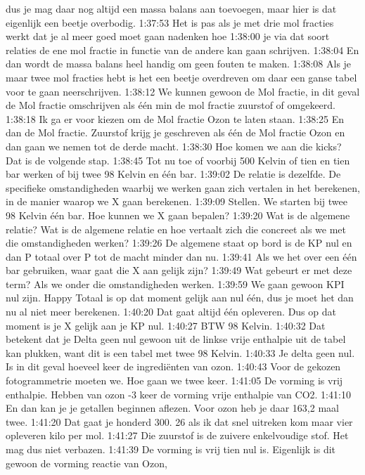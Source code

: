 dus je mag daar nog altijd een massa balans aan toevoegen, maar hier is dat eigenlijk een beetje overbodig.
1:37:53
Het is pas als je met drie mol fracties werkt dat je al meer goed moet gaan nadenken hoe
1:38:00
je via dat soort relaties de ene mol fractie in functie van de andere kan gaan schrijven.
1:38:04
En dan wordt de massa balans heel handig om geen fouten te maken.
1:38:08
Als je maar twee mol fracties hebt is het een beetje overdreven om daar een ganse tabel voor te gaan neerschrijven.
1:38:12
We kunnen gewoon de Mol fractie, in dit geval de Mol fractie omschrijven als één min de mol fractie zuurstof of omgekeerd.
1:38:18
Ik ga er voor kiezen om de Mol fractie Ozon te laten staan.
1:38:25
En dan de Mol fractie. Zuurstof krijg je geschreven als één de Mol fractie Ozon en dan gaan we nemen tot de derde macht.
1:38:30
Hoe komen we aan die kicks? Dat is de volgende stap.
1:38:45
Tot nu toe of voorbij 500 Kelvin of tien en tien bar werken of bij twee 98 Kelvin en één bar.
1:39:02
De relatie is dezelfde. De specifieke omstandigheden waarbij we werken gaan zich vertalen in het berekenen, in de manier waarop we X gaan berekenen.
1:39:09
Stellen. We starten bij twee 98 Kelvin één bar. Hoe kunnen we X gaan bepalen?
1:39:20
Wat is de algemene relatie? Wat is de algemene relatie en hoe vertaalt zich die concreet als we met die omstandigheden werken?
1:39:26
De algemene staat op bord is de KP nul en dan P totaal over P tot de macht minder dan nu.
1:39:41
Als we het over een één bar gebruiken, waar gaat die X aan gelijk zijn?
1:39:49
Wat gebeurt er met deze term? Als we onder die omstandigheden werken.
1:39:59
We gaan gewoon KPI nul zijn. Happy Totaal is op dat moment gelijk aan nul één, dus je moet het dan nu al niet meer berekenen.
1:40:20
Dat gaat altijd één opleveren. Dus op dat moment is je X gelijk aan je KP nul.
1:40:27
BTW 98 Kelvin.
1:40:32
Dat betekent dat je Delta geen nul gewoon uit de linkse vrije enthalpie uit de tabel kan plukken, want dit is een tabel met twee 98 Kelvin.
1:40:33
Je delta geen nul. Is in dit geval hoeveel keer de ingrediënten van ozon.
1:40:43
Voor de gekozen fotogrammetrie moeten we. Hoe gaan we twee keer.
1:41:05
De vorming is vrij enthalpie. Hebben van ozon -3 keer de vorming vrije enthalpie van CO2.
1:41:10
En dan kan je je getallen beginnen aflezen. Voor ozon heb je daar 163,2 maal twee.
1:41:20
Dat gaat je honderd 300. 26 als ik dat snel uitreken kom maar vier opleveren kilo per mol.
1:41:27
Die zuurstof is de zuivere enkelvoudige stof. Het mag dus niet verbazen.
1:41:39
De vorming is vrij tien nul is. Eigenlijk is dit gewoon de vorming reactie van Ozon,
